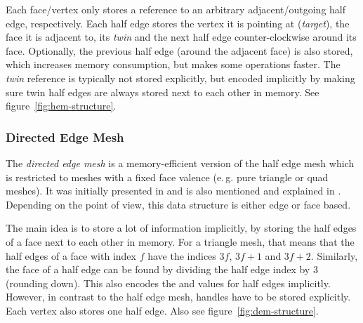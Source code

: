 Each face/vertex only stores a reference to an arbitrary adjacent/outgoing half edge, respectively.
Each half edge stores the vertex it is pointing at (\emph{target}), the face it is adjacent to, its \emph{twin} and the next half edge counter-clockwise around its face.
Optionally, the previous half edge (around the adjacent face) is also stored, which increases memory consumption, but makes some operations faster.
The \emph{twin} reference is typically not stored explicitly, but encoded implicitly by making sure twin half edges are always stored next to each other in memory.
See figure~\ref{fig:hem-structure}.


\newpage
\subsubsection*{Directed Edge Mesh}

The \emph{directed edge mesh} is a memory-efficient version of the half edge mesh which is restricted to meshes with a fixed face valence (e.\,g. pure triangle or quad meshes).
It was initially presented in \cite{campagna1998directed} and is also mentioned and explained in \cite[Chapter~2]{botsch2010polygon}.
Depending on the point of view, this data structure is either edge or face based.

The main idea is to store a lot of information implicitly, by storing the half edges of a face next to each other in memory.
For a triangle mesh, that means that the half edges of a face with index $f$ have the indices $3f$, $3f + 1$ and $3f + 2$.
Similarly, the face of a half edge can be found by dividing the half edge index by 3 (rounding down).
This also encodes the  and  values for half edges implicitly.
However, in contrast to the half edge mesh,  handles have to be stored explicitly.
Each vertex also stores one  half edge.
Also see figure~\ref{fig:dem-structure}.

